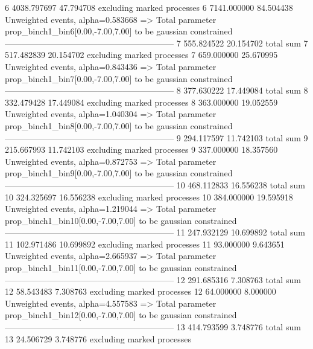 6          4038.797697     47.794708       excluding marked processes    
6          7141.000000     84.504438       Unweighted events, alpha=0.583668
  => Total parameter prop_binch1_bin6[0.00,-7.00,7.00] to be gaussian constrained
------------------------------------------------------------
7          555.824522      20.154702       total sum                     
7          517.482839      20.154702       excluding marked processes    
7          659.000000      25.670995       Unweighted events, alpha=0.843436
  => Total parameter prop_binch1_bin7[0.00,-7.00,7.00] to be gaussian constrained
------------------------------------------------------------
8          377.630222      17.449084       total sum                     
8          332.479428      17.449084       excluding marked processes    
8          363.000000      19.052559       Unweighted events, alpha=1.040304
  => Total parameter prop_binch1_bin8[0.00,-7.00,7.00] to be gaussian constrained
------------------------------------------------------------
9          294.117597      11.742103       total sum                     
9          215.667993      11.742103       excluding marked processes    
9          337.000000      18.357560       Unweighted events, alpha=0.872753
  => Total parameter prop_binch1_bin9[0.00,-7.00,7.00] to be gaussian constrained
------------------------------------------------------------
10         468.112833      16.556238       total sum                     
10         324.325697      16.556238       excluding marked processes    
10         384.000000      19.595918       Unweighted events, alpha=1.219044
  => Total parameter prop_binch1_bin10[0.00,-7.00,7.00] to be gaussian constrained
------------------------------------------------------------
11         247.932129      10.699892       total sum                     
11         102.971486      10.699892       excluding marked processes    
11         93.000000       9.643651        Unweighted events, alpha=2.665937
  => Total parameter prop_binch1_bin11[0.00,-7.00,7.00] to be gaussian constrained
------------------------------------------------------------
12         291.685316      7.308763        total sum                     
12         58.543483       7.308763        excluding marked processes    
12         64.000000       8.000000        Unweighted events, alpha=4.557583
  => Total parameter prop_binch1_bin12[0.00,-7.00,7.00] to be gaussian constrained
------------------------------------------------------------
13         414.793599      3.748776        total sum                     
13         24.506729       3.748776        excluding marked processes    
